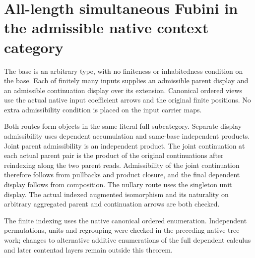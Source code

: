 \documentclass{article}
\begin{document}
\section*{All-length simultaneous Fubini in the admissible native context category}
The base is an arbitrary type, with no finiteness or inhabitedness
condition on the base. Each of finitely many inputs supplies an
admissible parent display and an admissible continuation display
over its extension. Canonical ordered views use the actual native
input coefficient arrows and the original finite positions. No
extra admissibility condition is placed on the input carrier maps.

Both routes form objects in the same literal full subcategory.
Separate display admissibility uses dependent accumulation and
same-base independent products. Joint parent admissibility is
an independent product. The joint continuation at each actual
parent pair is the product of the original continuations after
reindexing along the two parent reads. Admissibility of the
joint continuation therefore follows from pullbacks and product
closure, and the final dependent display follows from composition.
The nullary route uses the singleton unit display. The actual
indexed augmented isomorphism and its naturality on arbitrary
aggregated parent and continuation arrows are both checked.

The finite indexing uses the native canonical ordered enumeration.
Independent permutations, units and regrouping were checked in
the preceding native tree work; changes to alternative additive
enumerations of the full dependent calculus and later contentad
layers remain outside this theorem.
\end{document}
